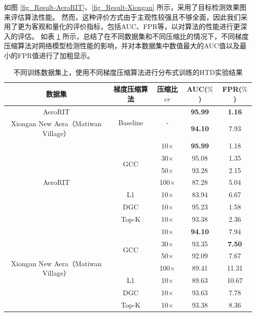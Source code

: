\documentclass{xdupgthesis}
\begin{document}
如图 \ref{fig_Result-AeroRIT}、\ref{fig_Result-Xiongan} 所示，采用了目标检测效果图来评估算法性能。
然而，这种评价方式由于主观性较强且不够全面，因此我们采用了更为客观和量化的评价指标，包括AUC、FPR等，以对算法的性能进行更深入的评估。
如表 \ref{tab_Result-gcc} 所示，总结了在不同数据集和不同压缩比的情况下，不同梯度压缩算法对网络模型检测性能的影响，并对本数据集中数值最大的AUC值以及最小的FPR值进行了加粗显示。

\renewcommand{\arraystretch}{1.3}
\begin{table}[ht]
    \centering
    \begin{threeparttable}
        \caption{不同训练数据集上，使用不同梯度压缩算法进行分布式训练的HTD实验结果}
        \label{tab_Result-gcc}
        \begin{tabular}{c|c|c|c|c}
            \toprule
            \toprule
            数据集 & 梯度压缩算法 & 压缩比$cr$ & AUC($\%$) & FPR($\%$) \\
            \midrule
            AeroRIT & \multirow{2}{*}{Baseline} & \multirow{2}{*}{-} & \textbf{95.99} & \textbf{1.16} \\
            Xiongan New Aera（Matiwan Village） &  &  & \textbf{94.10} & 7.93 \\
            \midrule
            \multirow{7}{*}{AeroRIT} & \multirow{4}{*}{GCC} & 10$\times$ & \textbf{95.99} & 1.18 \\
             &  & 30$\times$ & 95.08 & 1.35 \\
             &  & 50$\times$ & 93.28 & 2.15 \\
             &  & 100$\times$ & 87.28 & 5.04 \\
             & L1 & 10$\times$ & 83.94 & 6.67 \\
             & DGC\cite{lin2017deep} & 10$\times$ & 95.23 & 1.58 \\
             & Top-K\cite{aji2017sparse} & 10$\times$ & 93.38 & 2.36 \\
            \midrule
            \multirow{7}{*}{Xiongan New Aera（Matiwan Village）} & \multirow{4}{*}{GCC} & 10$\times$ & \textbf{94.10} & 7.94 \\
             &  & 30$\times$ & 93.35 & \textbf{7.50} \\
             &  & 50$\times$ & 92.09 & 7.67 \\
             &  & 100$\times$ & 89.41 & 11.31 \\
             & L1 & 10$\times$ & 89.63 & 10.67 \\
             & DGC\cite{lin2017deep} & 10$\times$ & 93.63 & 7.78 \\
             & Top-K\cite{aji2017sparse} & 10$\times$ & 93.38 & 8.36 \\
            \bottomrule
            \bottomrule
        \end{tabular}
    \end{threeparttable}
\end{table}
\end{document}
